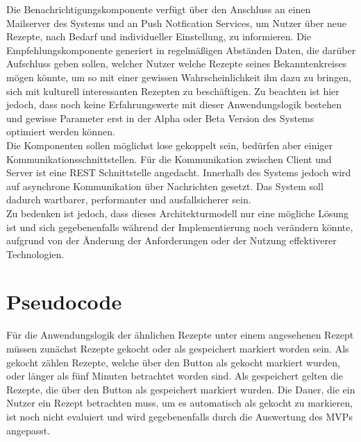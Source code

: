 Die Benachrichtigungskomponente verfügt über den Anschluss an einen Mailserver des Systems und an Push Notfication Services, um Nutzer über neue Rezepte, nach Bedarf und individueller Einstellung, zu informieren. Die Empfehlungskomponente generiert in regelmäßigen Abständen Daten, die darüber Aufschluss geben sollen, welcher Nutzer welche Rezepte seines Bekanntenkreises mögen könnte, um so mit einer gewissen Wahrscheinlichkeit ihn dazu zu bringen, sich mit kulturell interessanten Rezepten zu beschäftigen. Zu beachten ist hier jedoch, dass noch keine Erfahrungswerte mit dieser Anwendungslogik bestehen und gewisse Parameter erst in der Alpha oder Beta Version des Systems optimiert werden können.\\

Die Komponenten sollen möglichst lose gekoppelt sein, bedürfen aber einiger Kommunikationsschnittstellen. Für die Kommunikation zwischen Client und Server ist eine REST Schnittstelle angedacht. Innerhalb des Systems jedoch wird auf asynchrone Kommunikation über Nachrichten gesetzt. Das System soll dadurch wartbarer, performanter und ausfallsicherer sein. \\

Zu bedenken ist jedoch, dass dieses Architekturmodell nur eine mögliche Lösung ist und sich gegebenenfalls während der Implementierung noch verändern könnte, aufgrund von der Änderung der Anforderungen oder der Nutzung effektiverer Technologien.
\section{Pseudocode}
\label{subsec:SimilarRecipes}
Für die Anwendungslogik der ähnlichen Rezepte unter einem angesehenen Rezept müssen zunächst Rezepte gekocht oder als gespeichert markiert worden sein. Als gekocht zählen Rezepte, welche über den Button als gekocht markiert wurden, oder länger als fünf Minuten betrachtet worden sind. Als gespeichert gelten die Rezepte, die über den Button als gespeichert markiert wurden. Die Dauer, die ein Nutzer ein Rezept betrachten muss, um es automatisch als gekocht zu markieren, ist noch nicht evaluiert und wird gegebenenfalls durch die Auswertung des MVPs angepasst. \\

